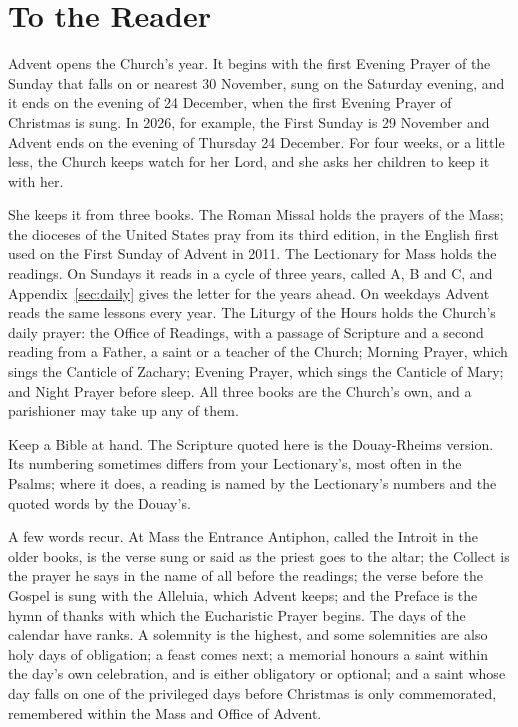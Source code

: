 \section*{To the Reader}

Advent opens the Church's year. It begins with the first Evening Prayer of the
Sunday that falls on or nearest 30 November, sung on the Saturday evening, and
it ends on the evening of 24 December, when the first Evening Prayer of
Christmas is sung. In 2026, for example, the First Sunday is 29 November and
Advent ends on the evening of Thursday 24 December. For four weeks, or a little
less, the Church keeps watch for her Lord, and she asks her children to keep it
with her.

She keeps it from three books. The Roman Missal holds the prayers of the Mass;
the dioceses of the United States pray from its third edition, in the English
first used on the First Sunday of Advent in 2011. The Lectionary for Mass holds
the readings. On Sundays it reads in a cycle of three years, called A, B and C, and
Appendix~\ref{sec:daily} gives the letter for the years ahead. On weekdays
Advent reads the same lessons every year. The Liturgy of the Hours
holds the Church's daily prayer: the Office of Readings, with a passage of
Scripture and a second reading from a Father, a saint or a teacher of the
Church; Morning Prayer, which sings the Canticle of Zachary; Evening Prayer,
which sings the Canticle of Mary; and Night Prayer before sleep. All three books
are the Church's own, and a parishioner may take up any of them.

Keep a Bible at hand. The Scripture quoted here is the Douay-Rheims version.
Its numbering sometimes differs from your Lectionary's, most often in the
Psalms; where it does, a reading is named by the Lectionary's numbers and the
quoted words by the Douay's.

A few words recur. At Mass the Entrance Antiphon, called the Introit in the
older books, is the verse sung or said as the priest goes to the altar; the
Collect is the prayer he says in the name of all before the readings; the verse
before the Gospel is sung with the Alleluia, which Advent keeps; and the
Preface is the hymn of thanks with which the Eucharistic Prayer begins. The days
of the calendar have ranks. A solemnity is the highest, and some solemnities
are also holy days of obligation; a feast comes next; a memorial honours a
saint within the day's own celebration, and is either obligatory or optional;
and a saint whose day falls on one of the privileged days before Christmas is
only commemorated, remembered within the Mass and Office of Advent.

